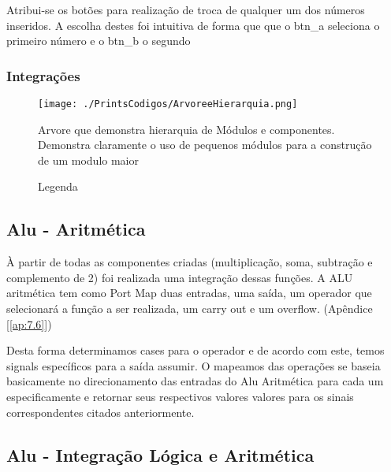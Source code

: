     Atribui-se os botões para realização de troca de qualquer um dos números inseridos. A escolha destes foi intuitiva de forma que que o btn\_a seleciona o primeiro número e o btn\_b o segundo
    
    
    
    
    \subsubsection{Integrações}
    


\begin{figure}[H] %
    \centering
    \texttt{[image: ./PrintsCodigos/ArvoreeHierarquia.png]}
    \caption{Legenda} Arvore que demonstra hierarquia de Módulos e componentes. Demonstra claramente o uso de pequenos módulos para a construção de um modulo maior
\end{figure}
    
    \subsection*{Alu - Aritmética}
    
    À partir de todas as componentes criadas (multiplicação, soma, subtração e complemento de 2) foi realizada uma integração dessas funções. A ALU aritmética tem como Port Map duas entradas, uma saída, um operador que selecionará a função a ser realizada, um carry out e um overflow. (Apêndice [\ref{ap:7.6}]) 
    
    Desta forma determinamos cases para o operador e de acordo com este, temos signals específicos para a saída assumir. O mapeamos das operações se baseia basicamente no direcionamento das entradas do Alu Aritmética para cada um especificamente e retornar seus respectivos valores valores para os sinais correspondentes citados anteriormente.\\
   
    \subsection*{Alu - Integração Lógica e Aritmética}
    
